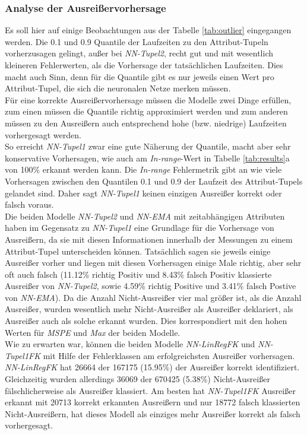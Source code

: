 \documentclass[
	12pt,
	a4paper,
	BCOR10mm,
	DIV14,
	listof=totoc,
	bibliography=totoc,
	headsepline
]{scrreprt}
\begin{document}
\subsubsection{Analyse der Ausreißervorhersage}
Es soll hier auf einige Beobachtungen aus der Tabelle \ref{tab:outlier} eingegangen werden.
Die 0.1 und 0.9 Quantile der Laufzeiten zu den Attribut-Tupeln vorherzusagen gelingt, außer bei \textit{NN-Tupel2}, recht gut und mit wesentlich kleineren Fehlerwerten, als die Vorhersage der tatsächlichen Laufzeiten.
Dies macht auch Sinn, denn für die Quantile gibt es nur jeweils einen Wert pro Attribut-Tupel, die sich die neuronalen Netze \glqq merken \grqq{}müssen.\\
Für eine korrekte Ausreißervorhersage müssen die Modelle zwei Dinge erfüllen, zum einen müssen die Quantile richtig approximiert werden und zum anderen müssen zu den Ausreißern auch entsprechend hohe (bzw. niedrige) Laufzeiten vorhergesagt werden.\\
So erreicht \textit{NN-Tupel1} zwar eine gute Näherung der Quantile, macht aber sehr konservative Vorhersagen, wie auch am \textit{In-range}-Wert in Tabelle \ref{tab:results}a von 100\% erkannt werden kann.
Die \textit{In-range} Fehlermetrik gibt an wie viele Vorhersagen zwischen den Quantilen 0.1 und 0.9 der Laufzeit des Attribut-Tupels gelandet sind.
 Daher sagt \textit{NN-Tupel1} keinen einzigen Ausreißer korrekt oder falsch voraus.\\
Die beiden Modelle \textit{NN-Tupel2} und \textit{NN-EMA} mit zeitabhängigen Attributen haben im Gegensatz zu \textit{NN-Tupel1} eine Grundlage für die Vorhersage von Ausreißern, da sie mit diesen Informationen innerhalb der Messungen zu einem Attribut-Tupel unterscheiden können.
Tatsächlich sagen sie jeweils einige Ausreißer vorher und liegen mit diesen Vorhersagen einige Male richtig, aber sehr oft auch falsch (11.12\% richtig Positiv und 8.43\% falsch Positiv klassierte Ausreißer von \textit{NN-Tupel2}, sowie 4.59\% richtig Positive und 3.41\% falsch Postive von \textit{NN-EMA}).
Da die Anzahl Nicht-Ausreißer vier mal größer ist, als die Anzahl Ausreißer, wurden wesentlich mehr Nicht-Ausreißer als Ausreißer deklariert, als Ausreißer auch als solche erkannt wurden. Dies korrespondiert mit den hohen Werten für \textit{MSPE} und \textit{Max} der beiden Modelle.\\
Wie zu erwarten war, können die beiden Modelle \textit{NN-LinRegFK} und \textit{NN-Tupel1FK} mit Hilfe der Fehlerklassen am erfolgreichsten Ausreißer vorhersagen. 
\textit{NN-LinRegFK} hat 26664 der 167175 (15.95\%) der Ausreißer korrekt identifiziert.
Gleichzeitig wurden allerdings 36069 der 670425 (5.38\%) Nicht-Ausreißer fälschlicherweise als Ausreißer klassiert.
Am besten hat \textit{NN-Tupel1FK} Ausreißer erkannt mit 20713 korrekt erkannten Ausreißern und nur 18772 falsch klassierten Nicht-Ausreißern, hat dieses Modell als einziges mehr Ausreißer korrekt als falsch vorhergesagt.\medskip
\end{document}
